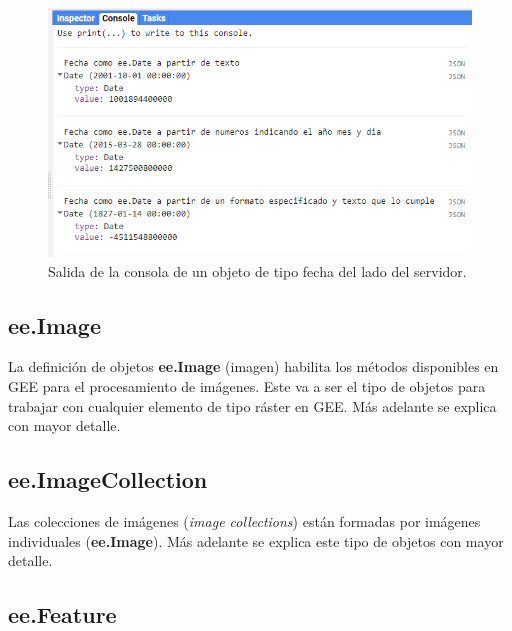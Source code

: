 \documentclass[
  12pt,
  letterpaper,
  twoside]{book}
\newcommand\boldpurple[1]{\textcolor{darkpurple}{\textbf{#1}}}
\begin{document}
\begin{figure}[H]

{\centering \includegraphics[width=0.95\linewidth]{Img/ej8} 

}

\caption{Salida de la consola de un objeto de tipo fecha del lado del servidor.}\label{fig:f511}
\end{figure}

\hypertarget{ee.image}{%
\subsection*{ee.Image}\label{ee.image}}

La definición de objetos \boldpurple{ee.Image} (imagen) habilita los métodos disponibles en GEE para el procesamiento de imágenes. Este va a ser el tipo de objetos para trabajar con cualquier elemento de tipo ráster en GEE. Más adelante se explica con mayor detalle.

\hypertarget{ee.imagecollection}{%
\subsection*{ee.ImageCollection}\label{ee.imagecollection}}

Las colecciones de imágenes (\emph{image collections}) están formadas por imágenes individuales (\boldpurple{ee.Image}). Más adelante se explica este tipo de objetos con mayor detalle.

\hypertarget{ee.feature}{%
\subsection*{ee.Feature}\label{ee.feature}}
\end{document}
